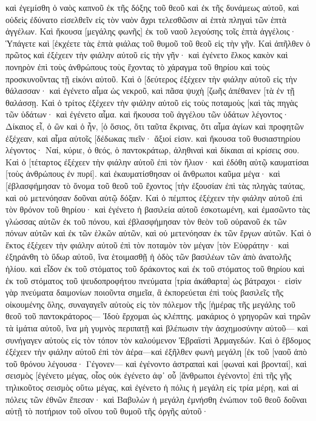 καὶ ἐγεμίσθη ὁ ναὸς καπνοῦ ἐκ τῆς δόξης τοῦ θεοῦ καὶ ἐκ τῆς δυνάμεως αὐτοῦ, καὶ οὐδεὶς ἐδύνατο εἰσελθεῖν εἰς τὸν ναὸν ἄχρι τελεσθῶσιν αἱ ἑπτὰ πληγαὶ τῶν ἑπτὰ ἀγγέλων. 
Καὶ ἤκουσα [μεγάλης φωνῆς] ἐκ τοῦ ναοῦ λεγούσης τοῖς ἑπτὰ ἀγγέλοις· Ὑπάγετε καὶ [ἐκχέετε τὰς ἑπτὰ φιάλας τοῦ θυμοῦ τοῦ θεοῦ εἰς τὴν γῆν. 
Καὶ ἀπῆλθεν ὁ πρῶτος καὶ ἐξέχεεν τὴν φιάλην αὐτοῦ εἰς τὴν γῆν· καὶ ἐγένετο ἕλκος κακὸν καὶ πονηρὸν ἐπὶ τοὺς ἀνθρώπους τοὺς ἔχοντας τὸ χάραγμα τοῦ θηρίου καὶ τοὺς προσκυνοῦντας τῇ εἰκόνι αὐτοῦ. 
Καὶ ὁ [δεύτερος ἐξέχεεν τὴν φιάλην αὐτοῦ εἰς τὴν θάλασσαν· καὶ ἐγένετο αἷμα ὡς νεκροῦ, καὶ πᾶσα ψυχὴ [ζωῆς ἀπέθανεν [τὰ ἐν τῇ θαλάσσῃ. 
Καὶ ὁ τρίτος ἐξέχεεν τὴν φιάλην αὐτοῦ εἰς τοὺς ποταμοὺς [καὶ τὰς πηγὰς τῶν ὑδάτων· καὶ ἐγένετο αἷμα. 
καὶ ἤκουσα τοῦ ἀγγέλου τῶν ὑδάτων λέγοντος· Δίκαιος εἶ, ὁ ὢν καὶ ὁ ἦν, [ὁ ὅσιος, ὅτι ταῦτα ἔκρινας, 
ὅτι αἷμα ἁγίων καὶ προφητῶν ἐξέχεαν, καὶ αἷμα αὐτοῖς [δέδωκας πιεῖν· ἄξιοί εἰσιν. 
καὶ ἤκουσα τοῦ θυσιαστηρίου λέγοντος· Ναί, κύριε, ὁ θεός, ὁ παντοκράτωρ, ἀληθιναὶ καὶ δίκαιαι αἱ κρίσεις σου. 
Καὶ ὁ [τέταρτος ἐξέχεεν τὴν φιάλην αὐτοῦ ἐπὶ τὸν ἥλιον· καὶ ἐδόθη αὐτῷ καυματίσαι [τοὺς ἀνθρώπους ἐν πυρί]. 
καὶ ἐκαυματίσθησαν οἱ ἄνθρωποι καῦμα μέγα· καὶ [ἐβλασφήμησαν τὸ ὄνομα τοῦ θεοῦ τοῦ ἔχοντος [τὴν ἐξουσίαν ἐπὶ τὰς πληγὰς ταύτας, καὶ οὐ μετενόησαν δοῦναι αὐτῷ δόξαν. 
Καὶ ὁ πέμπτος ἐξέχεεν τὴν φιάλην αὐτοῦ ἐπὶ τὸν θρόνον τοῦ θηρίου· καὶ ἐγένετο ἡ βασιλεία αὐτοῦ ἐσκοτωμένη, καὶ ἐμασῶντο τὰς γλώσσας αὐτῶν ἐκ τοῦ πόνου, 
καὶ ἐβλασφήμησαν τὸν θεὸν τοῦ οὐρανοῦ ἐκ τῶν πόνων αὐτῶν καὶ ἐκ τῶν ἑλκῶν αὐτῶν, καὶ οὐ μετενόησαν ἐκ τῶν ἔργων αὐτῶν. 
Καὶ ὁ ἕκτος ἐξέχεεν τὴν φιάλην αὐτοῦ ἐπὶ τὸν ποταμὸν τὸν μέγαν [τὸν Εὐφράτην· καὶ ἐξηράνθη τὸ ὕδωρ αὐτοῦ, ἵνα ἑτοιμασθῇ ἡ ὁδὸς τῶν βασιλέων τῶν ἀπὸ ἀνατολῆς ἡλίου. 
καὶ εἶδον ἐκ τοῦ στόματος τοῦ δράκοντος καὶ ἐκ τοῦ στόματος τοῦ θηρίου καὶ ἐκ τοῦ στόματος τοῦ ψευδοπροφήτου πνεύματα [τρία ἀκάθαρτα] ὡς βάτραχοι· 
εἰσὶν γὰρ πνεύματα δαιμονίων ποιοῦντα σημεῖα, ἃ ἐκπορεύεται ἐπὶ τοὺς βασιλεῖς τῆς οἰκουμένης ὅλης, συναγαγεῖν αὐτοὺς εἰς τὸν πόλεμον τῆς [ἡμέρας τῆς μεγάλης τοῦ θεοῦ τοῦ παντοκράτορος— 
Ἰδοὺ ἔρχομαι ὡς κλέπτης. μακάριος ὁ γρηγορῶν καὶ τηρῶν τὰ ἱμάτια αὐτοῦ, ἵνα μὴ γυμνὸς περιπατῇ καὶ βλέπωσιν τὴν ἀσχημοσύνην αὐτοῦ— 
καὶ συνήγαγεν αὐτοὺς εἰς τὸν τόπον τὸν καλούμενον Ἑβραϊστὶ Ἁρμαγεδών. 
Καὶ ὁ ἕβδομος ἐξέχεεν τὴν φιάλην αὐτοῦ ἐπὶ τὸν ἀέρα—καὶ ἐξῆλθεν φωνὴ μεγάλη [ἐκ τοῦ [ναοῦ ἀπὸ τοῦ θρόνου λέγουσα· Γέγονεν— 
καὶ ἐγένοντο ἀστραπαὶ καὶ [φωναὶ καὶ βρονταί], καὶ σεισμὸς [ἐγένετο μέγας, οἷος οὐκ ἐγένετο ἀφ᾽ οὗ [ἄνθρωποι ἐγένοντο] ἐπὶ τῆς γῆς τηλικοῦτος σεισμὸς οὕτω μέγας, 
καὶ ἐγένετο ἡ πόλις ἡ μεγάλη εἰς τρία μέρη, καὶ αἱ πόλεις τῶν ἐθνῶν ἔπεσαν· καὶ Βαβυλὼν ἡ μεγάλη ἐμνήσθη ἐνώπιον τοῦ θεοῦ δοῦναι αὐτῇ τὸ ποτήριον τοῦ οἴνου τοῦ θυμοῦ τῆς ὀργῆς αὐτοῦ· 
